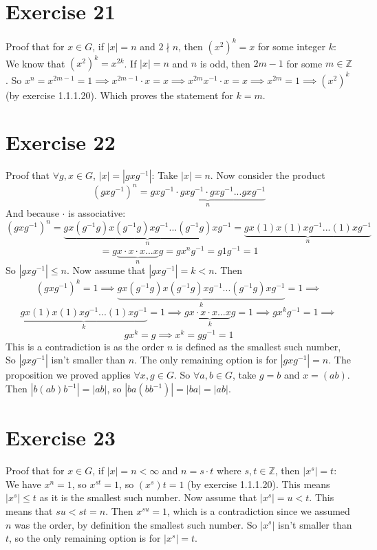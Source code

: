\documentclass[12pt]{article}
\newcommand{\Z}{\mathbb{Z}}
\begin{document}
    \section*{Exercise 21}
    Proof that for $x \in G$,
    if $|x| = n$ and $2 \nmid n$,
    then $(x^2)^k = x$ for some integer $k$:
    We know that $(x^2)^k = x^{2k}$.
    If $|x| = n$ and $n$ is odd,
    then $2m - 1$ for some $m \in \Z$.
    So $x^n = x^{2m-1} = 1
    \implies x^{2m-1} \cdot x = x
    \implies x^{2m}x^{-1} \cdot x = x
    \implies x^{2m} = 1
    \implies (x^{2})^{k}$ (by exercise 1.1.1.20).
    Which proves the statement for $k = m$.


    \section*{Exercise 22}
    Proof that $\forall g, x \in G$, $|x| = |gxg^{-1}|$:
    Take $|x| = n$.
    Now consider the product 
    \[(gxg^{-1})^n
    = \underbrace{gxg^{-1} \cdot gxg^{-1} \cdot gxg^{-1} ... gxg^{-1}}_{n}\]
    And because $\cdot$ is associative: 
    \[(gxg^{-1})^n
    = \underbrace{gx(g^{-1}g)x(g^{-1}g)xg^{-1} ... (g^{-1}g)xg^{-1}}_{n}
    = \underbrace{gx(1)x(1)xg^{-1} ... (1)xg^{-1}}_{n}\]
    \[= g\underbrace{x \cdot x \cdot x ... x}_{n}g
    = gx^ng^{-1}
    = g1g^{-1}
    = 1\]
    So $|gxg^{-1}| \leqslant n$.
    Now assume that $|gxg^{-1}| = k < n$.
    Then 
    \[(gxg^{-1})^{k} = 1
    \implies
    \underbrace{gx(g^{-1}g)x(g^{-1}g)xg^{-1} ... (g^{-1}g)xg^{-1}}_{k} = 1
    \implies\]
    \[\underbrace{gx(1)x(1)xg^{-1} ... (1)xg^{-1}}_{k} = 1
    \implies g\underbrace{x \cdot x \cdot x ... x}_{k}g = 1
    \implies gx^kg^{-1} = 1
    \implies\]
    \[gx^k = g
    \implies x^k = gg^{-1} = 1\]
    This is a contradiction is as the order $n$
    is defined as the smallest such number,
    So $|gxg^{-1}|$ isn't smaller than $n$.
    The only remaining option is for $|gxg^{-1}| = n$.
    The proposition we proved applies $\forall x, g \in G$.
    So $\forall a, b \in G$,
    take $g = b$ and $x = (ab)$.
    Then $|b(ab)b^{-1}| = |ab|$,
    so  $|ba(bb^{-1})| = |ba| = |ab|$.


    \section*{Exercise 23}
    Proof that for $x \in G$,
    if $|x| = n < \infty$ and $n = s \cdot t$ where $s, t \in \Z$,
    then $|x^s| = t$: \\
    We have $x^n = 1$,
    so $x^{st} = 1$,
    so $(x^{s}){t} = 1$ (by exercise 1.1.1.20).
    This means $|x^s| \leqslant t$ as it is the smallest such number.
    Now assume that $|x^s| = u < t$.
    This means that $su < st = n$.
    Then $x^{su} = 1$,
    which is a contradiction since we assumed $n$ was the order,
    by definition the smallest such number.
    So $|x^s|$ isn't smaller than $t$,
    so the only remaining option is for $|x^s| = t$.
    
\end{document}
